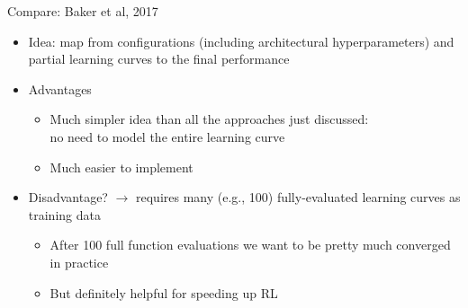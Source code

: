 \begin{frame}{Compare: Baker et al, 2017 }

	\begin{itemize}
		\item Idea: map from configurations (including architectural hyperparameters) 
		and partial learning curves to the final performance

		\item Advantages
		\begin{itemize}
			\item \alert{Much simpler idea} than all the approaches just discussed:\\ no need to model the entire learning curve
			\item \alert{Much easier to implement}
		\end{itemize}
		\item Disadvantage? \pause
		\alert{$\rightarrow$ requires many (e.g., 100) fully-evaluated learning curves as training data}
		\begin{itemize}
			\item After 100 full function evaluations we want to be pretty much converged in practice
			\item But definitely helpful for speeding up RL
			
		\end{itemize}
	\end{itemize}

\end{frame}
